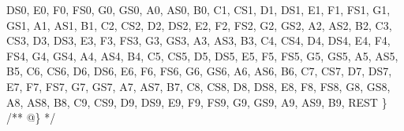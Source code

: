\begin{DoxyCodeInclude}
        DS0,
        E0,
        F0,
        FS0,
        G0,
        GS0,
        A0,
        AS0,
        B0,
        C1,
        CS1,
        D1,
        DS1,
        E1,
        F1,
        FS1,
        G1,
        GS1,
        A1,
        AS1,
        B1,
        C2,
        CS2,
        D2,
        DS2,
        E2,
        F2,
        FS2,
        G2,
        GS2,
        A2,
        AS2,
        B2,
        C3,
        CS3,
        D3,
        DS3,
        E3,
        F3,
        FS3,
        G3,
        GS3,
        A3,
        AS3,
        B3,
        C4,
        CS4,
        D4,
        DS4,
        E4,
        F4,
        FS4,
        G4,
        GS4,
        A4,
        AS4,
        B4,
        C5,
        CS5,
        D5,
        DS5,
        E5,
        F5,
        FS5,
        G5,
        GS5,
        A5,
        AS5,
        B5,
        C6,
        CS6,
        D6,
        DS6,
        E6,
        F6,
        FS6,
        G6,
        GS6,
        A6,
        AS6,
        B6,
        C7,
        CS7,
        D7,
        DS7,
        E7,
        F7,
        FS7,
        G7,
        GS7,
        A7,
        AS7,
        B7,
        C8,
        CS8,
        D8,
        DS8,
        E8,
        F8,
        FS8,
        G8,
        GS8,
        A8,
        AS8,
        B8,
        C9,
        CS9,
        D9,
        DS9,
        E9,
        F9,
        FS9,
        G9,
        GS9,
        A9,
        AS9,
        B9,
        REST
    \}\textcolor{comment}{}
\textcolor{comment}{    /** @\} */}


\end{DoxyCodeInclude}
